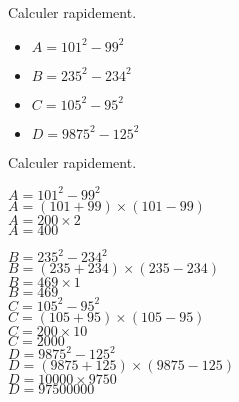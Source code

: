 \begin{exercice*}
    Calculer rapidement.
    \begin{multicols}{2}
        \begin{itemize}
            \item[] $A=101^2-99^2$
            \item[] $B=235^2-234^2$
            \item[] $C=105^2-95^2$
            \item[] $D=\num{9875}^2-125^2$
        \end{itemize}
    \end{multicols}
\end{exercice*}
\begin{corrige}
    Calculer rapidement.
    
        \begin{itemize}
            \def\item{}
            \item $A=101^2-99^2$\\
            {\red 
            $A=(101+99)\times (101-99)$\\
            $A=200\times 2$\\
            $A=400$
            }\\

            \medskip
        \end{itemize}
        \Coupe
        \begin{itemize}
            \def\item{}
            \item $B=235^2-234^2$\\
            {\red 
            $B=(235+234)\times (235-234)$\\
            $B=469\times 1$\\
            $B=469$
            }\\

            \medskip
            \item $C=105^2-95^2$\\
            {\red 
            $C=(105+95)\times (105-95)$\\
            $C=200\times 10$\\
            $C=\num{2000}$
            }\\

            \medskip
            \item $D=\num{9875}^2-125^2$\\
            {\red 
            $D=(\num{9875}+125)\times (\num{9875}-125)$\\
            $D=\num{10000}\times \num{9750}$\\
            $D=\num{97 500 000}$
            }\\

            \medskip
        \end{itemize}
        \vspace*{-20mm}
\end{corrige}

